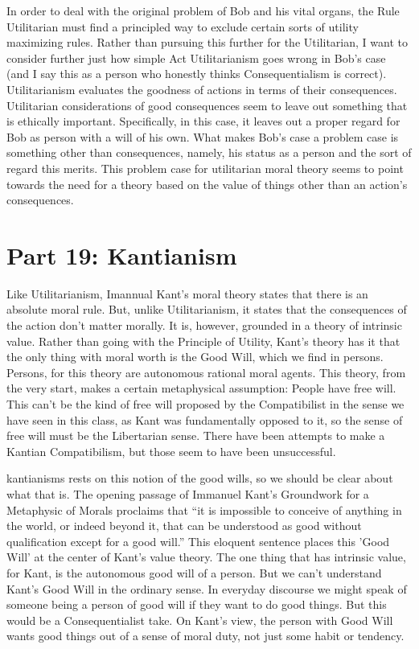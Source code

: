 In order to deal with the original problem of Bob and his vital organs, the Rule Utilitarian must find a principled way to exclude certain sorts of utility maximizing rules. Rather than pursuing this further for the Utilitarian, I want to consider further just how simple Act Utilitarianism goes wrong in Bob’s case (and I say this as a person who honestly thinks Consequentialism is correct). Utilitarianism evaluates the goodness of actions in terms of their consequences. Utilitarian considerations of good consequences seem to leave out something that is ethically important. Specifically, in this case, it leaves out a proper regard for Bob as person with a will of his own. What makes Bob’s case a problem case is something other than consequences, namely, his status as a person and the sort of regard this merits. This problem case for utilitarian moral theory seems to point towards the need for a theory based on the value of things other than an action’s consequences.

\chapter{Part 19: Kantianism}

Like Utilitarianism, Imannual Kant’s moral theory states that there is an absolute moral rule. But, unlike Utilitarianism, it states that the consequences of the action don't matter morally. It is, however, grounded in a theory of intrinsic value. Rather than going with the Principle of Utility, Kant's theory has it that the only thing with moral worth is the Good Will, which we find in persons. Persons, for this theory are  autonomous rational moral agents. This theory, from the very start, makes a certain metaphysical assumption: People have free will. This can't be the kind of free will proposed by the Compatibilist in the sense we have seen in this class, as Kant was fundamentally opposed to it, so the sense of free will must be the Libertarian sense. There have been attempts to make a Kantian Compatibilism, but those seem to have been unsuccessful.

\glspl{kantianism} rests on this notion of the \glspl{good will}, so we should be clear about what that is. The opening passage of Immanuel Kant’s Groundwork for a Metaphysic of Morals proclaims that “it is impossible to conceive of anything in the world, or indeed beyond it, that can be understood as good without qualification except for a good will.” This eloquent sentence places this 'Good Will' at the center of Kant's value theory. The one thing that has intrinsic value, for Kant, is the autonomous good will of a person. But we can't understand Kant's Good Will in the ordinary sense. In everyday discourse we might speak of someone being a person of good will if they want to do good things. But this would be a Consequentialist take. On Kant’s view, the person with Good Will wants  good things out of a sense of moral duty, not just some habit or tendency.

